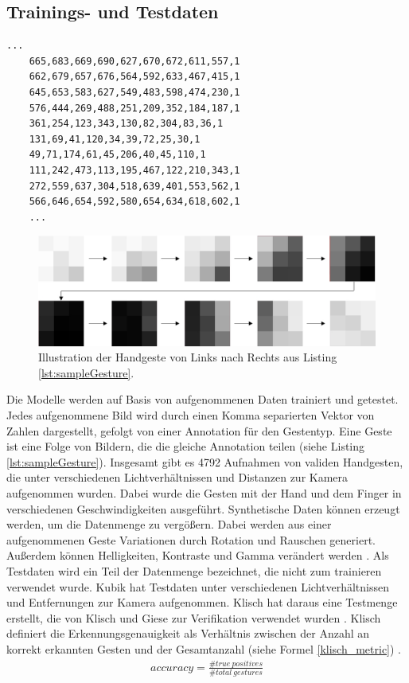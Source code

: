 \subsection{Trainings- und Testdaten}
\label{sec:synthetischeDaten}
\label{sec:testdaten}
\begin{lstlisting}[label=lst:sampleGesture,caption={Beispiel einer gespeicherten Handgeste von Links nach Rechts.}]
    ...
    665,683,669,690,627,670,672,611,557,1
    662,679,657,676,564,592,633,467,415,1
    645,653,583,627,549,483,598,474,230,1
    576,444,269,488,251,209,352,184,187,1
    361,254,123,343,130,82,304,83,36,1
    131,69,41,120,34,39,72,25,30,1
    49,71,174,61,45,206,40,45,110,1
    111,242,473,113,195,467,122,210,343,1
    272,559,637,304,518,639,401,553,562,1
    566,646,654,592,580,654,634,618,602,1
    ...
\end{lstlisting}
\begin{figure}
    \centering
    \includegraphics[width=\linewidth]{images/sample_gesture_total.jpg}
    \caption{Illustration der Handgeste von Links nach Rechts aus Listing \ref{lst:sampleGesture}.}
    \label{fig:sample_gesture}
\end{figure}
Die Modelle werden auf Basis von aufgenommenen Daten trainiert und getestet. Jedes aufgenommene Bild wird durch einen Komma separierten Vektor von Zahlen dargestellt, gefolgt von einer Annotation für den Gestentyp.
Eine Geste ist eine Folge von Bildern, die die gleiche Annotation teilen (siehe Listing \ref{lst:sampleGesture}). Insgesamt gibt es 4792 Aufnahmen von validen Handgesten, die unter verschiedenen Lichtverhältnissen
und Distanzen zur Kamera aufgenommen wurden. Dabei wurde die Gesten mit der Hand und dem Finger in verschiedenen Geschwindigkeiten ausgeführt.
\newline
\newline
Synthetische Daten können erzeugt werden, um die Datenmenge zu vergößern. Dabei werden aus einer aufgenommenen Geste Variationen durch Rotation und Rauschen generiert. Außerdem können Helligkeiten,
Kontraste und Gamma verändert werden \cite{venzkeArticle}.
\newline
\newline
Als Testdaten wird ein Teil der Datenmenge bezeichnet, die nicht zum trainieren verwendet wurde. Kubik hat Testdaten unter verschiedenen Lichtverhältnissen und Entfernungen zur Kamera aufgenommen. Klisch hat
daraus eine Testmenge erstellt, die von Klisch und Giese zur Verifikation verwendet wurden \cite{klischThesis, gieseThesis}. Klisch definiert die Erkennungsgenauigkeit als Verhältnis zwischen der Anzahl an korrekt
erkannten Gesten und der Gesamtanzahl (siehe Formel \ref{klisch_metric}) \cite{klischThesis}.
\begin{align}
    accuracy = \frac{\#true\ positives}{\#total\ gestures}
    \label{klisch_metric}
\end{align}
